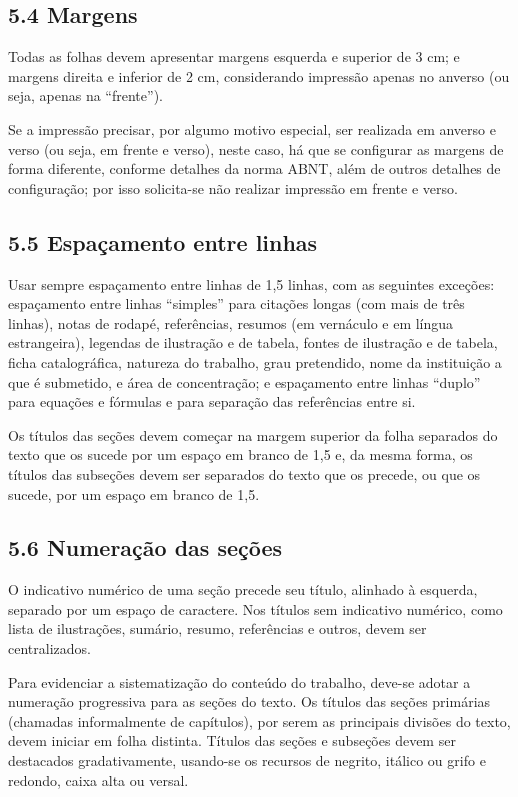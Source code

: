 \documentclass[
	12pt,				%
	oneside,			%
	a4paper,			%
	english,			%
	brazil				%
	]{abntex2ppgsi}
\begin{document}
\begin{anexosenv}
\subsection*{5.4 Margens}

Todas as folhas devem apresentar margens esquerda e superior de 3 cm; e margens direita e inferior de 2 cm, considerando impressão apenas no anverso (ou seja, apenas na ``frente''). 

Se a impressão precisar, por algumo motivo especial, ser realizada em anverso e verso (ou seja, em frente e verso), neste caso, há que se configurar as margens de forma diferente, conforme detalhes da norma ABNT, além de outros detalhes de configuração; por isso solicita-se não realizar impressão em frente e verso.

\subsection*{5.5 Espaçamento entre linhas}

Usar sempre espaçamento entre linhas de 1,5 linhas, com as seguintes exceções: espaçamento entre linhas ``simples'' para citações longas (com mais de três linhas), notas de rodapé, referências, resumos (em vernáculo e em língua estrangeira), legendas de ilustração e de tabela, fontes de ilustração e de tabela, ficha catalográfica, natureza do trabalho, grau pretendido, nome da instituição a que é submetido, e área de concentração; e espaçamento entre linhas ``duplo'' para equações e fórmulas e para separação das referências entre si.

Os títulos das seções devem começar na margem superior da folha separados do texto que os sucede por um espaço em branco de 1,5 e, da mesma forma, os títulos das subseções devem ser separados do texto que os precede, ou que os sucede, por um espaço em branco de 1,5.

\subsection*{5.6 Numeração das seções}

O indicativo numérico de uma seção precede seu título, alinhado à esquerda, separado por um espaço de caractere. Nos títulos sem indicativo numérico, como lista de ilustrações, sumário, resumo, referências e outros, devem ser centralizados.

Para evidenciar a sistematização do conteúdo do trabalho, deve-se adotar a numeração progressiva para as seções do texto. Os títulos das seções primárias (chamadas informalmente de capítulos), por serem as principais divisões do texto, devem iniciar em folha distinta. Títulos das seções e subseções devem ser destacados gradativamente, usando-se os recursos de negrito, itálico ou grifo e redondo, caixa alta ou versal.


\end{anexosenv}
\end{document}

